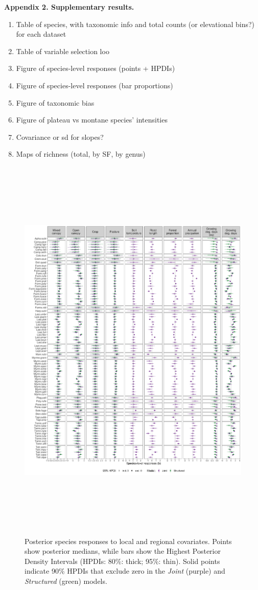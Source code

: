 \documentclass[preprint,review,times,12pt]{elsarticle}
\begin{document}
\textbf{Appendix 2. Supplementary results.}
\begin{enumerate}
    \item Table of species, with taxonomic info and total counts (or elevational bins?) for each dataset
    \item Table of variable selection loo
    \item Figure of species-level responses (points + HPDIs)
    \item Figure of species-level responses (bar proportions)
    \item Figure of taxonomic bias
    \item Figure of plateau vs montane species' intensities
    \item Covariance or sd for slopes?
    \item Maps of richness (total, by SF, by genus)
\end{enumerate}

\begin{figure}
	\centering\includegraphics[height=7.5in]{ms/1_Ecography/1/figs/b_opt_byParam.png}
	\caption{\label{fig:b_byParam} Posterior species responses to local and regional covariates. Points show posterior medians, while bars show the Highest Posterior Density Intervals (HPDIs: 80\%: thick; 95\%: thin). Solid points indicate 90\% HPDIs that exclude zero in the \emph{Joint} (purple) and \emph{Structured} (green) models.}
\end{figure}
\end{document}
